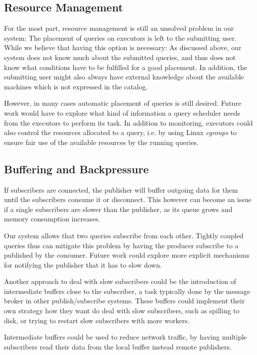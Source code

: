 \subsection{Resource Management}

For the most part, resource management is still an unsolved problem in our
system: The placement of queries on executors is left to the submitting user.
While we believe that having this option is necessary: As discussed above, 
our system does not know much about the submitted queries, and thus does not
know what conditions have to be fulfilled for a good placement. In addition,
the submitting user might also always have external knowledge about the
available machines which is not expressed in the catalog.

However, in many cases automatic placement of queries is still desired. Future
work would have to explore what kind of information a query scheduler needs
from the executors to perform its task. In addition to monitoring, executors
could also control the resources allocated to a query, i.e. by using Linux
\emph{cgroups} \cite{cgroups} to ensure fair use of the available resources
by the running queries.

\subsection{Buffering and Backpressure}

If subscribers are connected, the publisher will buffer outgoing data for them
until the subscribers consume it or disconnect. This however can become an issue
if a single subscribers are slower than the publisher, as its queue grows and
memory consumption increases.

Our system allows that two queries subscribe from each other. Tightly coupled
queries thus can mitigate this problem by having the producer subscribe to
a  published by the consumer. Future work could
explore more explicit mechanisms for notifying the publisher that it has to
slow down.

Another approach to deal with slow subscribers could be the introduction of
intermediate buffers close to the subscriber, a task typically done by the
message broker in other publish/subscribe systems. These buffers could
implement their own strategy how they want do deal with slow subscribers,
such as spilling to disk, or trying to restart slow subscribers with more
workers.

Intermediate buffers could be used to reduce network traffic, by having
multiple subscribers read their data from the local buffer instead remote
publishers.



